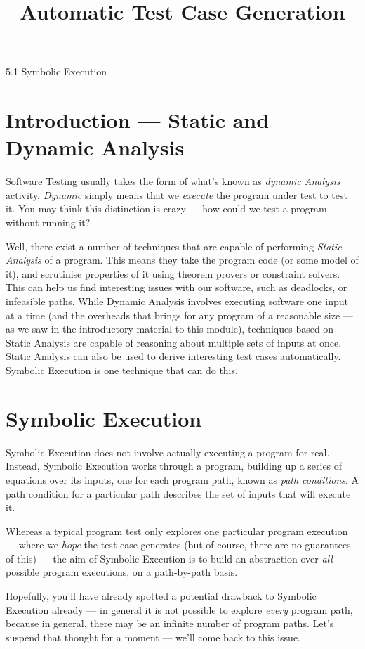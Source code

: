



\title{Automatic Test Case Generation}{5.1 Symbolic Execution}

\section{Introduction --- Static and Dynamic Analysis}

Software Testing usually takes the form of what's known as {\it dynamic
Analysis} activity. {\it Dynamic} simply means that we {\it execute} the program
under test to test it. You may think this distinction is crazy --- how could we
test a program without running it? 

Well, there exist a number of techniques that are capable of performing {\it
Static Analysis} of a program. This means they take the program code (or some
model of it), and scrutinise properties of it using theorem provers or
constraint solvers. This can help us find interesting issues with our software,
such as deadlocks, or infeasible paths. While Dynamic Analysis involves
executing software one input at a time (and the overheads that brings for any
program of a reasonable size --- as we saw in the introductory material to this
module), techniques based on Static Analysis are capable of reasoning about
multiple sets of inputs at once. Static Analysis can also be used to derive
interesting test cases automatically. Symbolic Execution is one technique that
can do this.

\section{Symbolic Execution}

Symbolic Execution does not involve actually executing a program for real.
Instead, Symbolic Execution works through a program, building up a series of
equations over its inputs, one for each program path, known as {\it path
conditions}. A path condition for a particular path describes the set of inputs
that will execute it.

Whereas a typical program test only explores one particular program execution
--- where we {\it hope} the test case generates (but of course, there are no
guarantees of this) --- the aim of Symbolic Execution is to build an abstraction
over {\it all} possible program executions, on a path-by-path basis.

Hopefully, you'll have already spotted a potential drawback to Symbolic
Execution already --- in general it is not possible to explore {\it every}
program path, because in general, there may be an infinite number of program
paths. Let's suspend that thought for a moment --- we'll come back to this issue.

